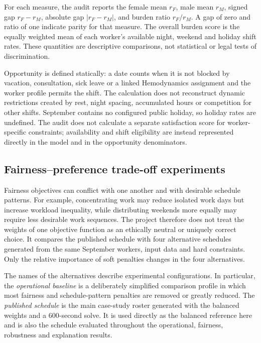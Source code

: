 \documentclass[11pt,a4paper]{article}
\begin{document}
For each measure, the audit reports the female mean $r_F$, male mean $r_M$, signed gap $r_F-r_M$, absolute gap $|r_F-r_M|$, and burden ratio $r_F/r_M$. A gap of zero and ratio of one indicate parity for that measure. The overall burden score is the equally weighted mean of each worker's available night, weekend and holiday shift rates. These quantities are descriptive comparisons, not statistical or legal tests of discrimination.

Opportunity is defined statically: a date counts when it is not blocked by vacation, consultation, sick leave or a linked Hemodynamics assignment and the worker profile permits the shift. The calculation does not reconstruct dynamic restrictions created by rest, night spacing, accumulated hours or competition for other shifts. September contains no configured public holiday, so holiday rates are undefined. The audit does not calculate a separate satisfaction score for worker-specific constraints; availability and shift eligibility are instead represented directly in the model and in the opportunity denominators.

\subsection{Fairness--preference trade-off experiments}

Fairness objectives can conflict with one another and with desirable schedule patterns. For example, concentrating work may reduce isolated work days but increase workload inequality, while distributing weekends more equally may require less desirable work sequences. The project therefore does not treat the weights of one objective function as an ethically neutral or uniquely correct choice. It compares the published schedule with four alternative schedules generated from the same September workers, input data and hard constraints. Only the relative importance of soft penalties changes in the four alternatives.

The names of the alternatives describe experimental configurations. In particular, the \emph{operational baseline} is a deliberately simplified comparison profile in which most fairness and schedule-pattern penalties are removed or greatly reduced. The \emph{published schedule} is the main case-study roster generated with the balanced weights and a 600-second solve. It is used directly as the balanced reference here and is also the schedule evaluated throughout the operational, fairness, robustness and explanation results.
\end{document}
